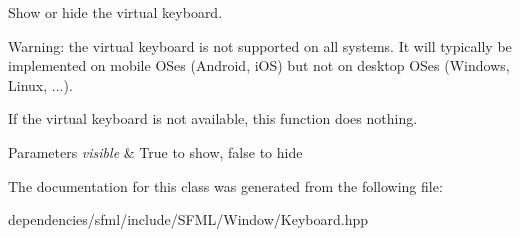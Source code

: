 Show or hide the virtual keyboard. 

Warning\+: the virtual keyboard is not supported on all systems. It will typically be implemented on mobile O\+Ses (Android, i\+OS) but not on desktop O\+Ses (Windows, Linux, ...).

If the virtual keyboard is not available, this function does nothing.


\begin{DoxyParams}{Parameters}
{\em visible} & True to show, false to hide \\
\hline
\end{DoxyParams}


The documentation for this class was generated from the following file\+:\begin{DoxyCompactItemize}
\item 
dependencies/sfml/include/\+S\+F\+M\+L/\+Window/Keyboard.\+hpp\end{DoxyCompactItemize}
